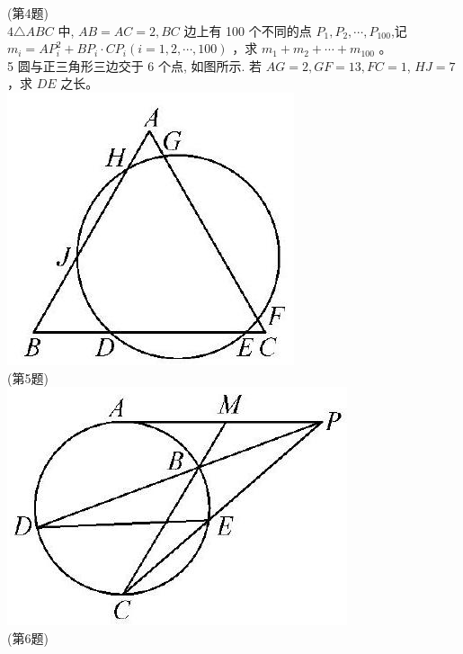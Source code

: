 \documentclass[10pt]{article}
\begin{document}
(第4题)\\
$4 \triangle A B C$ 中, $A B=A C=2, B C$ 边上有 100 个不同的点 $P_{1}, P_{2}, \cdots, P_{100}$,记 $m_{i}=A P_{i}^{2}+B P_{i} \cdot C P_{i}(i=1,2, \cdots, 100)$ ，求 $m_{1}+m_{2}+\cdots+m_{100}$ 。\\
5 圆与正三角形三边交于 6 个点, 如图所示. 若 $A G=2, G F=13, F C=1$, $H J=7$ ，求 $D E$ 之长。\\
\includegraphics[max width=\textwidth, center]{2024_10_30_66b8e5e701da2093c133g-057(2)}\\
(第5题)\\
\includegraphics[max width=\textwidth, center]{2024_10_30_66b8e5e701da2093c133g-057(3)}\\
(第6题)
\end{document}
